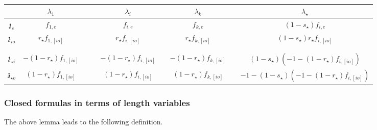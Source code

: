 \documentclass[11pt]{amsart}
\theoremstyle{definition}
\theoremstyle{remark}
\numberwithin{equation}{section}
\begin{document}
\begin{table}
  \centering
\begin{tabular}{|c|c|c|c|c|c|c|c|c|}
\hline
  & $\displaystyle \lambda _{1}$ &  &  & $\displaystyle \lambda _{i}$ &  & $\displaystyle \lambda _{k}$ &  & $\displaystyle \lambda _{\star }$ \\
\hline
 $\displaystyle \mathfrak{z}_{e}$ & $\displaystyle f_{1,e}$ &  &  & $\displaystyle f_{i,e}$ &  & $\displaystyle f_{k,e}$ &  & $\displaystyle (1-s_{\star})f_{i,e}$ \\
\hline
 $\displaystyle \mathfrak{z}_{io}$ & $\displaystyle r_{\star}f_{1,[ io]}$ &  &  & $\displaystyle r_{\star}f_{i,[ io]}$ &  & $\displaystyle r_{\star}f_{k,[ io]}$ &  & $\displaystyle (1-s_{\star})r_{\star}f_{i,[ io]}$ \\
\hline
  &  &  &  &  &  &  &  &  \\
\hline
  &  &  &  &  &  &  &  &  \\
\hline
 $\displaystyle \mathfrak{z}_{\star i}$ & $\displaystyle -( 1-r_{\star}) f_{1,[ io]}$ &  &  & $\displaystyle -( 1-r_{\star}) f_{i,[ io]}$ &  & $\displaystyle -( 1-r_{\star}) f_{k,[ io]}$ &  & $\displaystyle (1-s_{\star})( -1-( 1-r_{\star}) f_{i,[ io]})$ \\
\hline
 $\displaystyle \mathfrak{z}_{\star o}$ & $\displaystyle ( 1-r_{\star}) f_{1,[ io]}$ &  &  & $\displaystyle ( 1-r_{\star}) f_{i,[ io]}$ &  & $\displaystyle ( 1-r_{\star}) f_{k,[ io]}$ &  & $\displaystyle -1-(1-s_{\star})( -1-( 1-r_{\star}) f_{i,[ io]})$ \\
 \hline
\end{tabular}

  \caption{}\label{}
\end{table}
\fi
\iffalse
\subsubsection{Closed formulas in terms of length variables}
The above lemma leads to the following definition.
\end{document}
